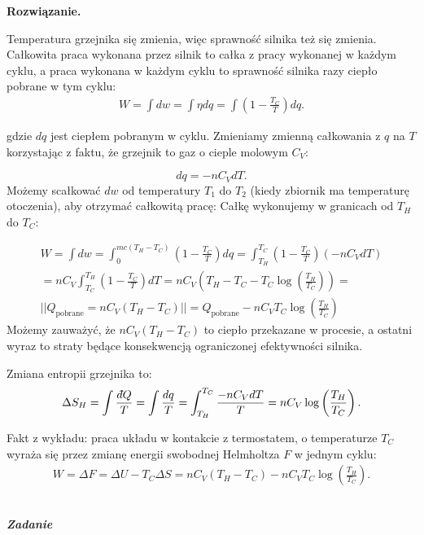 \documentclass[11pt,a4paper]{article}
\newcommand{\dbar} {\ensuremath{\,\mathchar'26\mkern-12mu d}}
\newcounter{zadanie}\newcommand{\zadanie}[1][]{\addtocounter{zadanie}{1} ~\\ {\bf \emph{Zadanie \arabic{zadanie} #1 }} \\}
\newenvironment{solution}{\vspace{1cm} \par\textbf{Rozwiązanie.} \vspace{1cm}}{}
\begin{document}
\begin{solution}

Temperatura grzejnika się zmienia, więc sprawność silnika też się zmienia.
Całkowita praca wykonana przez silnik to całka z pracy wykonanej w każdym cyklu,
a praca wykonana w każdym cyklu to sprawność silnika razy ciepło pobrane w tym cyklu:
\begin{align*}
  W = \int dw = \int \eta dq = \int \left(1 - \frac{T_C}{T}\right) dq.
\end{align*} 

gdzie $dq$ jest ciepłem pobranym w cyklu. Zmieniamy zmienną całkowania z 
$q$ na $T$ korzystając z faktu, że grzejnik to gaz o cieple molowym $C_V$:

\begin{equation}
dq = - n C_V d T.
\end{equation}
Możemy scałkować $dw$ od temperatury $T_1$ do $T_2$ (kiedy zbiornik ma temperaturę otoczenia), aby otrzymać całkowitą pracę:
Całkę wykonujemy w granicach od $T_H$ do $T_C$:

\begin{align}
W = \int dw = \int_0^{mc (T_H-T_C)} \left(1-\frac{T_C}{T}\right) dq = 
\int_{T_H}^{T_C} \left(1-\frac{T_C}{T}\right) (-n C_V dT) \\
= n C_V \int_{T_C}^{T_H}\left(1-\frac{T_C}{T}\right) dT = 
n C_V \left(T_H-T_C - T_C \log\left(\frac{T_H}{T_C}\right)\right) = \\
|| Q_\text{pobrane} = n C_V (T_H - T_C) || =
Q_\text{pobrane} - n C_V T_C \log\left(\frac{T_H}{T_C}\right)
\end{align} 
Możemy zauważyć, że $n C_V \left(T_H-T_C\right)$ to ciepło przekazane 
w procesie, a ostatni wyraz to straty będące konsekwencją ograniczonej 
efektywności silnika. 

\vskip 0.5cm

Zmiana entropii grzejnika to:
\begin{align*}
\Delta S_H = \int \frac{\dbar Q}{T} = \int \frac{dq}{T} = \int_{T_H}^{T_C} \frac{-n C_V dT}{T} = n C_V \log\left(\frac{T_H}{T_C}\right).
\end{align*}


Fakt z wykładu: praca układu w kontakcie z termostatem, o temperaturze $T_{C}$ wyraża 
się przez zmianę energii swobodnej Helmholtza $F$ w jednym cyklu:
\begin{align*}
W = \Delta F = \Delta U - T_C \Delta S = n C_V (T_H - T_C) - n C_V T_C \log\left(\frac{T_H}{T_C}\right).
\end{align*}

\newpage
\end{solution}
\zadanie[]
\end{document}

